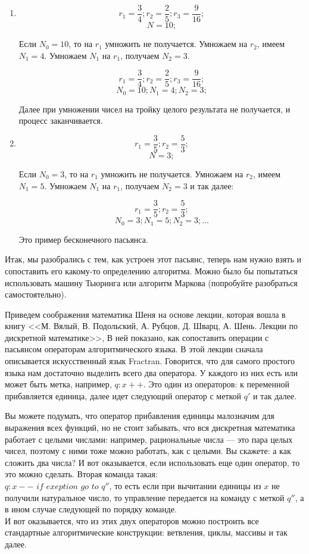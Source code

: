 \documentclass[russian]{lecture-notes}
\begin{document}
	\begin{example*}
		\begin{enumerate}
			\item 
			$$r_1 = \frac{3}{4}; r_2 = \frac{2}{5}; r_3 = \frac{9}{16};$$
			$$N = 10;$$
			
			Если $N_0 = 10$, то на $r_1$ умножить не получается. Умножаем на $r_2$, имеем $N_1 = 4$. Умножаем $N_1$ на $r_1$, получаем $N_2 = 3$.
			
			$$r_1 = \frac{3}{4}; r_2 = \frac{2}{5}; r_3 = \frac{9}{16};$$
			$$N_0 = 10; N_1 = 4; N_2 = 3;$$
			
			Далее при умножении чисел на тройку целого результата не получается, и процесс заканчивается.  
			
			\item 
			$$r_1 = \frac{3}{5}; r_2 = \frac{5}{3};$$
			$$N = 3;$$
			
			Если $N_0 = 3$, то на $r_1$ умножить не получается. Умножаем на $r_2$, имеем $N_1 = 5$. Умножаем $N_1$ на $r_1$, получаем $N_2 = 3$ и так далее:
			
			$$r_1 = \frac{3}{5}; r_2 = \frac{5}{3};$$
			$$N_0 = 3; N_1 = 5; N_2 = 3; \ldots$$
			
			Это пример бесконечного пасьянса.
		\end{enumerate}
	\end{example*}
	
	Итак, мы разобрались с тем, как устроен этот пасьянс, теперь нам нужно взять и сопоставить его какому-то определению алгоритма. Можно было бы попытаться использовать машину Тьюринга или алгоритм Маркова (попробуйте разобраться самостоятельно). 
	
	Приведем соображения математика Шеня на основе лекции, которая вошла в книгу <<М. Вялый, В. Подольский, А. Рубцов, Д. Шварц, А. Шень. Лекции по дискретной математике>>, В ней показано, как сопоставить операции с пасьянсом операторам алгоритмического языка. В этой лекции сначала описывается искусственный язык Fractran. Говорится, что для самого простого языка нам достаточно выделить всего два оператора. У каждого из них есть или может быть метка, например, $q: x + +$. Это один из операторов: к переменной прибавляется единица, далее  идет следующий оператор с меткой $q'$ и так далее.
	
	Вы можете подумать, что оператор прибавления единицы малозначим для выражения всех функций, но не стоит забывать, что вся дискретная математика работает с целыми числами: например, рациональные числа --- это пара целых чисел, поэтому с ними тоже можно работать, как с целыми. Вы скажете: а как сложить два числа? И вот оказывается, если использовать еще один оператор, то это можно сделать. Вторая команда такая:\\ $q: x - -$ $if$ $exeption$ $go$ $to$ $q''$, то есть если при вычитании единицы из $x$ не получили натуральное число, то управление передается на команду с меткой $q''$, а в ином случае следующей по порядку команде. \\
	И вот оказывается, что из этих двух операторов можно построить все стандартные алгоритмические конструкции: ветвления, циклы, массивы и так далее. 
	
\end{document}
